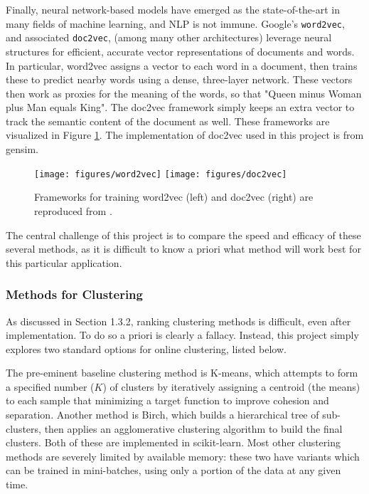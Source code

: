 \documentclass[]{article}
\begin{document}
Finally, neural network-based models have emerged as the state-of-the-art in many fields of machine learning, and NLP is not immune. Google's \texttt{word2vec}, and associated \texttt{doc2vec}, (among many other architectures) leverage neural structures for efficient, accurate vector representations of documents and words\cite{doc2vec}. In particular, word2vec assigns a vector to each word in a document, then trains these to predict nearby words using a dense, three-layer network. These vectors then work as proxies for the meaning of the words, so that "Queen minus Woman plus Man equals King". The doc2vec framework simply keeps an extra vector to track the semantic content of the document as well. These frameworks are visualized in Figure \ref{fig:doc2vec}. The implementation of doc2vec used in this project is from gensim\cite{gensim}.
\begin{figure}[h]
\centering
\texttt{[image: figures/word2vec]}
\texttt{[image: figures/doc2vec]}
\caption{Frameworks for training word2vec (left) and doc2vec (right) are reproduced from \cite{doc2vec}.}
\label{fig:doc2vec}
\end{figure}

The central challenge of this project is to compare the speed and efficacy of these several methods, as it is difficult to know a priori what method will work best for this particular application.

\subsubsection{Methods for Clustering}
As discussed in Section 1.3.2, ranking clustering methods is difficult, even after implementation. To do so a priori is clearly a fallacy. Instead, this project simply explores two standard options for online clustering, listed below.

The pre-eminent baseline clustering method is K-means, which attempts to form a specified number ($K$) of clusters by iteratively assigning a centroid (the means) to each sample that minimizing a target function to improve cohesion and separation. Another method is Birch, which builds a hierarchical tree of sub-clusters, then applies an agglomerative clustering algorithm to build the final clusters. Both of these are implemented in scikit-learn\cite{scikit-learn}. Most other clustering methods are severely limited by available memory: these two have variants which can be trained in mini-batches, using only a portion of the data at any given time.
\end{document}
